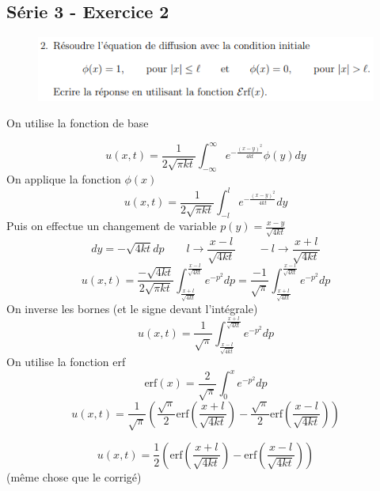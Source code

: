 \documentclass[resume]{subfiles}
\begin{document}
\begin{multicols}{2}
\subsection{Série 3 - Exercice 2}
\label{S3E2}
\begin{figure}[H]
\centering
\includegraphics[scale=0.5]{img_9.png}
\end{figure}
On utilise la fonction de base

$$u(x,t)=\frac{1}{2\sqrt{\pi kt}}\int_{-\infty}^{\infty}e^{-\frac{(x-y)^2}{4kt}}\phi(y)dy$$
On applique la fonction $\phi(x)$
$$u(x,t)=\frac{1}{2\sqrt{\pi kt}}\int_{-l}^{l}e^{-\frac{(x-y)^2}{4kt}}dy$$
Puis on effectue un changement de variable $p(y)=\frac{x-y}{\sqrt{4kt}}$
$$dy=-\sqrt{4kt}dp\qquad l\to \frac{x-l}{\sqrt{4kt}}\qquad -l\to\frac{x+l}{\sqrt{4kt}}$$
$$u(x,t)=\frac{-\sqrt{4kt}}{2\sqrt{\pi kt}}\int_{\frac{x+l}{\sqrt{4kt}}}^{\frac{x-l}{\sqrt{4kt}}}e^{-p^2}dp=\frac{-1}{\sqrt{\pi}}\int_{\frac{x+l}{\sqrt{4kt}}}^{\frac{x-l}{\sqrt{4kt}}}e^{-p^2}dp$$
On inverse les bornes (et le signe devant l'intégrale)
$$u(x,t)=\frac{1}{\sqrt{\pi}}\int_{\frac{x-l}{\sqrt{4kt}}}^{\frac{x+l}{\sqrt{4kt}}}e^{-p^2}dp$$
On utilise la fonction erf
$$\text{erf}(x)=\frac{2}{\sqrt{\pi}}\int_{0}^{x}e^{-p^2}dp$$
$$u(x,t)=\frac{1}{\sqrt{\pi}}\left(\frac{\sqrt{\pi}}{2}\text{erf}\left(\frac{x+l}{\sqrt{4kt}}\right)-\frac{\sqrt{\pi}}{2}\text{erf}\left(\frac{x-l}{\sqrt{4kt}}\right)\right)$$

$$\boxed{u(x,t)=\frac{1}{2}\left(\text{erf}\left(\frac{x+l}{\sqrt{4kt}}\right)-\text{erf}\left(\frac{x-l}{\sqrt{4kt}}\right)\right)}$$
(même chose que le corrigé)

\end{multicols}
\end{document}
